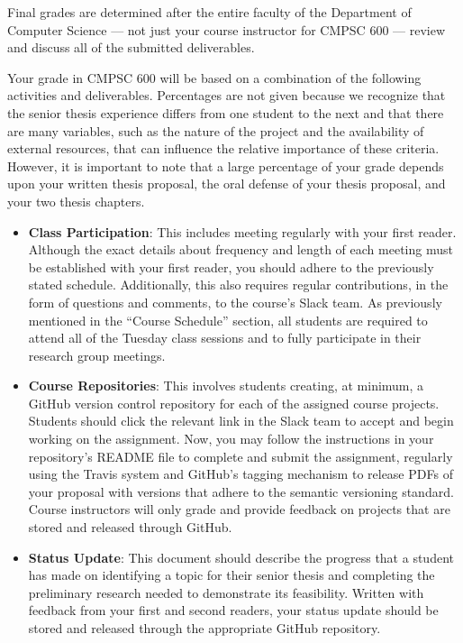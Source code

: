 \documentclass[11pt]{article}
\begin{document}
Final grades are determined after the entire faculty of the Department of
Computer Science --- not just your course instructor for CMPSC 600 --- review
and discuss all of the submitted deliverables.

Your grade in CMPSC 600 will be based on a combination of the following
activities and deliverables. Percentages are not given because we recognize that
the senior thesis experience differs from one student to the next and that there
are many variables, such as the nature of the project and the availability of
external resources, that can influence the relative importance of these
criteria. However, it is important to note that a large percentage of your grade
depends upon your written thesis proposal, the oral defense of your thesis
proposal, and your two thesis chapters.

\begin{itemize}
  \itemsep -.25em

  \item {\bf Class Participation}: This includes meeting regularly with your
    first reader. Although the exact details about frequency and length of each
    meeting must be established with your first reader, you should adhere to the
    previously stated schedule. Additionally, this also requires regular
    contributions, in the form of questions and comments, to the course's Slack
    team. As previously mentioned in the ``Course Schedule'' section, all
    students are required to attend all of the Tuesday class sessions and to
    fully participate in their research group meetings.

  \item {\bf Course Repositories}: This involves students creating, at minimum,
    a GitHub version control repository for each of the assigned course
    projects. Students should click the relevant link in the Slack team to
    accept and begin working on the assignment. Now, you may follow the
    instructions in your repository's README file to complete and submit the
    assignment, regularly using the Travis system and GitHub's tagging mechanism
    to release PDFs of your proposal with versions that adhere to the semantic
    versioning standard. Course instructors will only grade and provide feedback
    on projects that are stored and released through GitHub.

  \item {\bf Status Update}: This document should describe the progress that a
    student has made on identifying a topic for their senior thesis and
    completing the preliminary research needed to demonstrate its feasibility.
    Written with feedback from your first and second readers, your status update
    should be stored and released through the appropriate GitHub repository.


\end{itemize}
\end{document}
